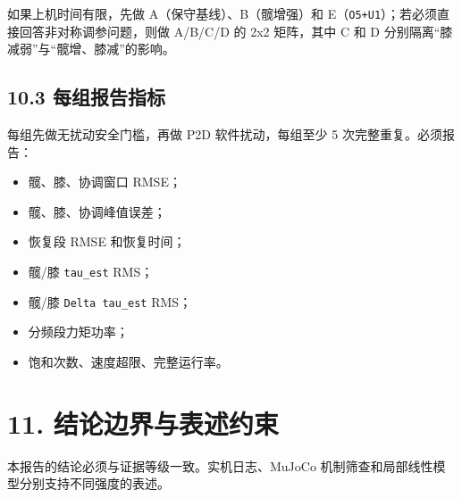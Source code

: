 如果上机时间有限，先做 A（保守基线）、B（髋增强）和 E（\texttt{O5+U1}）；若必须直接回答非对称调参问题，则做 A/B/C/D 的 2x2 矩阵，其中 C 和 D 分别隔离``膝减弱''与``髋增、膝减''的影响。

\subsection{10.3 每组报告指标}\label{ux6bcfux7ec4ux62a5ux544aux6307ux6807}

每组先做无扰动安全门槛，再做 P2D 软件扰动，每组至少 5 次完整重复。必须报告：

\begin{itemize}
\tightlist
\item
  髋、膝、协调窗口 RMSE；
\item
  髋、膝、协调峰值误差；
\item
  恢复段 RMSE 和恢复时间；
\item
  髋/膝 \texttt{tau\_est} RMS；
\item
  髋/膝 \texttt{Delta\ tau\_est} RMS；
\item
  分频段力矩功率；
\item
  饱和次数、速度超限、完整运行率。
\end{itemize}

\section{11. 结论边界与表述约束}\label{ux7ed3ux8bbaux8fb9ux754cux4e0eux8868ux8ff0ux7ea6ux675f}

本报告的结论必须与证据等级一致。实机日志、MuJoCo 机制筛查和局部线性模型分别支持不同强度的表述。

